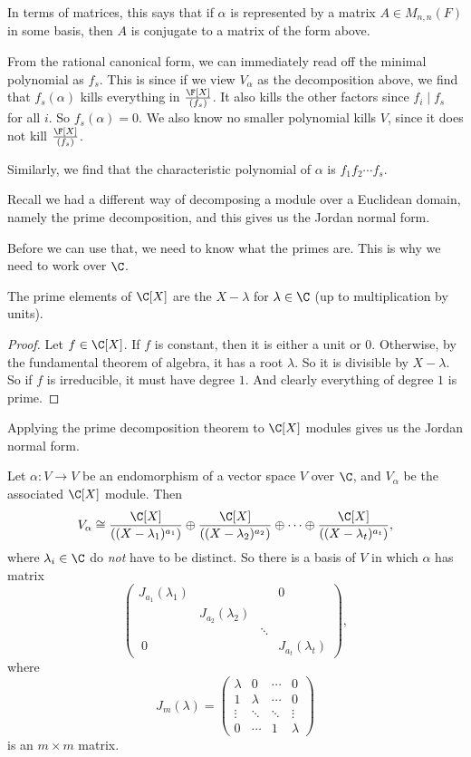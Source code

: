 \documentclass[a4paper]{article}
\begin{document}
In terms of matrices, this says that if $\alpha$ is represented by a matrix $A \in M_{n, n} (F)$ in some basis, then $A$ is conjugate to a matrix of the form above.

From the rational canonical form, we can immediately read off the minimal polynomial as $f_s$. This is since if we view $V_\alpha$ as the decomposition above, we find that $f_s(\alpha)$ kills everything in $\frac{\F[X]}{(f_s)}$. It also kills the other factors since $f_i \mid f_s$ for all $i$. So $f_s(\alpha) = 0$. We also know no smaller polynomial kills $V$, since it does not kill $\frac{\F[X]}{(f_s)}$.

Similarly, we find that the characteristic polynomial of $\alpha$ is $f_1 f_2 \cdots f_s$.

Recall we had a different way of decomposing a module over a Euclidean domain, namely the prime decomposition, and this gives us the Jordan normal form.

Before we can use that, we need to know what the primes are. This is why we need to work over $\C$.

\begin{lemma}
  The prime elements of $\C[X]$ are the $X - \lambda$ for $\lambda \in \C$ (up to multiplication by units).
\end{lemma}

\begin{proof}
  Let $f \in \C[X]$. If $f$ is constant, then it is either a unit or $0$. Otherwise, by the fundamental theorem of algebra, it has a root $\lambda$. So it is divisible by $X - \lambda$. So if $f$ is irreducible, it must have degree $1$. And clearly everything of degree $1$ is prime.
\end{proof}

Applying the prime decomposition theorem to $\C[X]$ modules gives us the Jordan normal form.

\begin{thm}
  Let $\alpha: V \to V$ be an endomorphism of a vector space $V$ over $\C$, and $V_\alpha$ be the associated $\C[X]$ module. Then
  \[
    V_\alpha \cong \frac{\C[X]}{((X - \lambda_1)^{a_1})} \oplus \frac{\C[X]}{((X - \lambda_2)^{a_2})} \oplus \cdots \oplus \frac{\C[X]}{((X - \lambda_t)^{a_t})},
  \]
  where $\lambda_i \in \C$ do \emph{not} have to be distinct. So there is a basis of $V$ in which $\alpha$ has matrix
  \[
    \begin{pmatrix}
      J_{a_1}(\lambda_1) & & & 0\\
      & J_{a_2}(\lambda_2)\\
      & & \ddots\\\
      0 & & & J_{a_t} (\lambda_t)
    \end{pmatrix},
  \]
  where
  \[
    J_m (\lambda) =
    \begin{pmatrix}
      \lambda & 0 & \cdots & 0\\
      1 & \lambda & \cdots & 0\\
      \vdots & \ddots & \ddots & \vdots\\
      0 & \cdots & 1 & \lambda
    \end{pmatrix}
  \]
  is an $m \times m$ matrix.
\end{thm}
\end{document}
